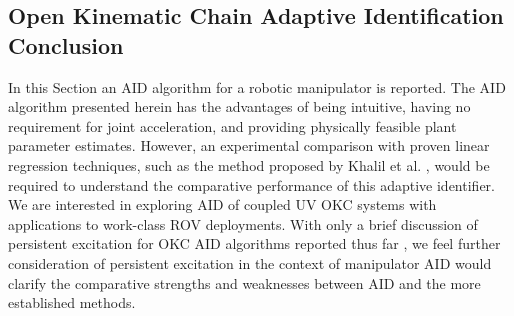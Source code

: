 

\subsection{Open Kinematic Chain Adaptive Identification Conclusion}

In this Section an \ac{AID} algorithm for a robotic manipulator is
reported.
The \ac{AID} algorithm presented herein has the advantages of being
intuitive, having no requirement for joint acceleration, and providing
physically feasible plant parameter estimates.  However, an
experimental comparison with proven linear regression techniques, such
as the method proposed by Khalil et al. \cite{Khalil2007}, would be
required to understand the comparative performance of this adaptive
identifier. We are interested in exploring \ac{AID} of coupled \ac{UV}
\ac{OKC} systems with applications to work-class \ac{ROV} deployments.
With only a brief discussion of persistent excitation for \acl{OKC}
\acl{AID} algorithms reported thus far
\cite{hsu&bodson&sastry&paden.icra87}, we feel further consideration
of persistent excitation in the context of manipulator \acl{AID} would
clarify the comparative strengths and weaknesses between \acl{AID} and
the more established methods.
